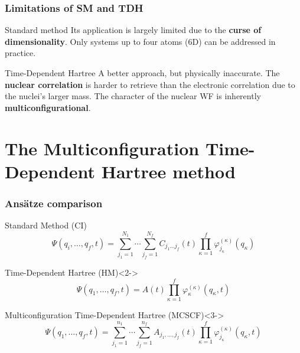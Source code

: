 \documentclass{beamer}
\begin{document}
\begin{frame}
  \frametitle{Limitations of SM and TDH}
  \begin{exampleblock}{Standard method}
    \justifying{}
    Its application is largely limited due to the \textbf{curse of dimensionality}. Only systems up to four atoms (6D) can be addressed in practice.
  \end{exampleblock}
  \begin{block}{Time-Dependent Hartree}
    A better approach, but physically inaccurate. The \textbf{nuclear correlation} is harder to retrieve
    than the electronic correlation due to the nuclei's larger mass. The character of the nuclear WF is inherently \textbf{multiconfigurational}. 
  \end{block}
\end{frame}

\section{The Multiconfiguration Time-Dependent Hartree method}\label{mctdh}

\begin{frame}
  \frametitle{Ansätze comparison}
  \vspace{-.3cm}
  \begin{block}{Standard Method (CI)}
    \begin{equation}
      \Psi(q_i,\ldots, q_f, t) = \sum_{j_1=1}^{N_1}\cdots\sum_{j_f=1}^{N_f} C_{j_1\ldots j_f}(t)\prod_{\kappa=1}^f\varphi^{(\kappa)}_{j_{\kappa}}(q_{\kappa})
    \end{equation}
  \end{block}
  \begin{exampleblock}{Time-Dependent Hartree (HM)}<2->
    \begin{equation}
      \Psi(q_1,\ldots, q_f, t) = A(t)\prod^f_{\kappa=1}\varphi_{\kappa}^{(\kappa)}(q_{\kappa}, t)
    \end{equation}
  \end{exampleblock}

  \begin{alertblock}{Multiconfiguration Time-Dependent Hartree (MCSCF)}<3->
    \begin{equation}
      \Psi(q_1,\ldots, q_f, t) = \sum^{n_1}_{j_1=1}\cdots\sum^{n_f}_{j_f=1}A_{j_1,\ldots,j_f}(t)\prod^{f}_{\kappa=1}\varphi^{(\kappa)}_{j_{\kappa}}(q_{\kappa}, t)
      \label{mctdh_antz}
    \end{equation}
  \end{alertblock}
\end{frame}
\end{document}
